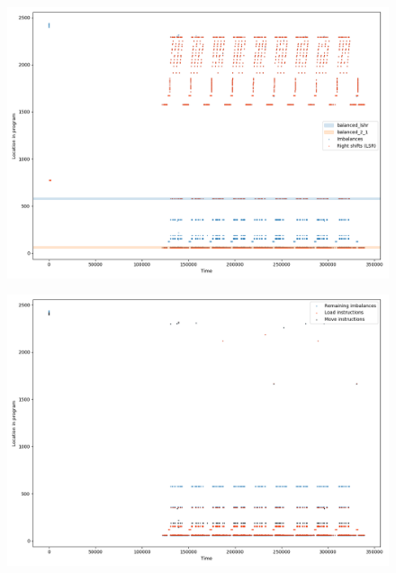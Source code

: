 \documentclass[11pt,t,usepdftitle=false,aspectratio=169]{beamer}
\begin{document}
\begin{frame}
  \begin{figure}
    \centering
    \includegraphics[height=\textheight]{imbalances-1.png}
  \end{figure}

\end{frame}
\begin{frame}
  \begin{figure}
    \centering
    \includegraphics[height=\textheight]{imbalances-2.png}
  \end{figure}

\end{frame}
\end{document}
